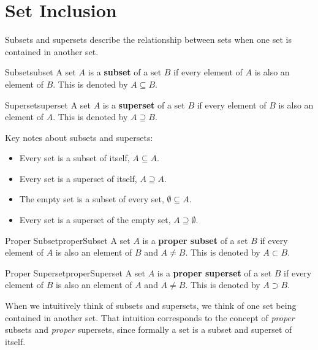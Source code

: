 \section{Set Inclusion}
Subsets and supersets describe the relationship between sets when one set is contained in
another set.

\begin{definition}{Subset}{subset}
  A set \( A \) is a \textbf{subset} of a set \( B \) if every element of
  \( A \) is also an element of \( B \).  This is denoted by \( A \subseteq B \).
\end{definition}

\begin{definition}
    {Superset}{superset}
    A set \( A \) is a \textbf{superset} of a set \( B \) if every element of
    \( B \) is also an element of \( A \). This is denoted by \( A \supseteq B \).
\end{definition}

Key notes about subsets and supersets:
\begin{itemize}
  \item Every set is a subset of itself, \( A \subseteq A \).
  \item Every set is a superset of itself, \( A \supseteq A \).
  \item The empty set is a subset of every set, \( \emptyset \subseteq A \).
  \item Every set is a superset of the empty set, \( A \supseteq \emptyset \).
\end{itemize}


\begin{definition}{Proper Subset}{properSubset}
  A set \( A \) is a \textbf{proper subset} of a set \( B \) if every element of
  \( A \) is also an element of \( B \) and \( A \neq B \). This is denoted by
  \( A \subset B \).
\end{definition}

\begin{definition}
    {Proper Superset}{properSuperset}
    A set \( A \) is a \textbf{proper superset} of a set \( B \) if every element of
    \( B \) is also an element of \( A \) and \( A \neq B \). This is denoted by
    \( A \supset B \).
\end{definition}

When we intuitively think of subsets and supersets, we think of one set being
contained in another set. That intuition corresponds to the concept of \emph{proper}
subsets and \emph{proper} supersets, since formally a set is a subset and
superset of itself.

